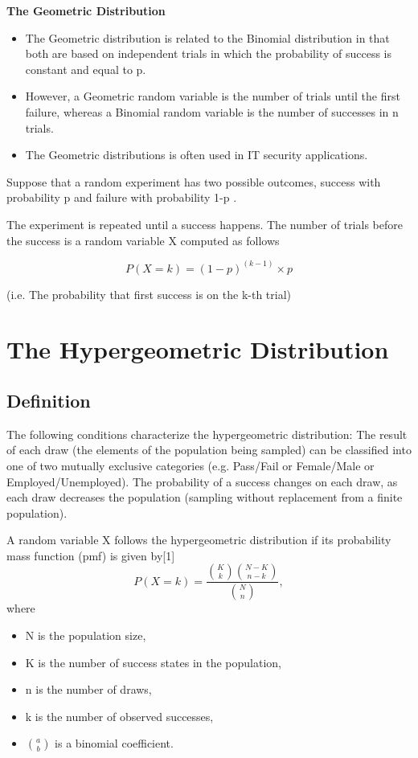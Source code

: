 \documentclass[]{report}
\begin{document}
	{
		\textbf{The Geometric Distribution}
		\begin{itemize}
			\item The Geometric distribution is related to the Binomial distribution in that
			both are based on independent trials in which the probability of success
			is constant and equal to p.
			\item However, a Geometric random variable is the number of trials until the
			first failure, whereas a Binomial random variable is the number of
			successes in n trials.
			\item The Geometric distributions is often used in IT security applications.
		\end{itemize}
		
		
		Suppose that a random experiment has two possible outcomes, success
		with probability p and failure with probability 1-p .
		
		
		The experiment is repeated until a success happens. The number of
		trials before the success is a random variable X computed as follows
		
		\[P(X = k) = (1-p)^{(k-1)}\times p \]
		
		
		(i.e. The probability that first success is on the k-th trial)
		
		
		
\newpage

			\section{The Hypergeometric Distribution }
			\subsection{Definition}
			
			The following conditions characterize the hypergeometric distribution:
			The result of each draw (the elements of the population being sampled) can be classified into one of two mutually exclusive categories (e.g. Pass/Fail or Female/Male or Employed/Unemployed).
			The probability of a success changes on each draw, as each draw decreases the population (sampling without replacement from a finite population).
			
			A random variable X follows the hypergeometric distribution if its probability mass function (pmf) is given by[1]
			\[ P(X = k) = \frac{\binom{K}{k} \binom{N - K}{n-k}}{\binom{N}{n}},\]
			where
			\begin{itemize}
				\item N is the population size,
				\item K is the number of success states in the population,
				\item n is the number of draws,
				\item k is the number of observed successes,
				\item $\textstyle {a \choose b}$ is a binomial coefficient.
			\end{itemize}
			
}
\end{document}
